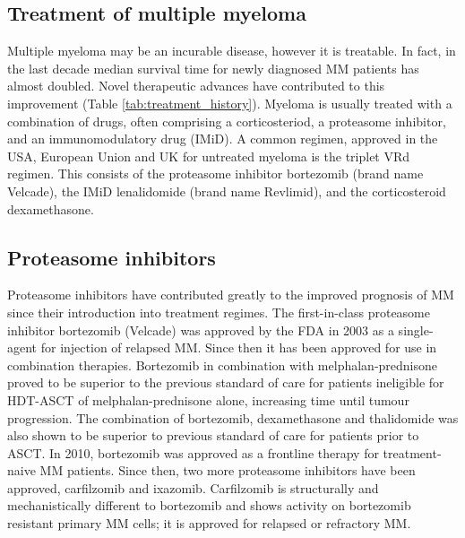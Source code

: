 \subsection{Treatment of multiple myeloma}\label{subsec:mm_treatment}
Multiple myeloma may be an incurable disease, however it is treatable.
In fact, in the last decade median survival time for newly diagnosed MM patients has almost doubled\cite{kazandjian2016look}.
Novel therapeutic advances have contributed to this improvement (Table \ref{tab:treatment_history}).
Myeloma is usually treated with a combination of drugs, often comprising a corticosteriod, a proteasome inhibitor, and an immunomodulatory drug (IMiD).
A common regimen, approved in the USA, European Union and UK for untreated myeloma is the triplet VRd regimen.
This consists of the proteasome inhibitor bortezomib (brand name Velcade), the IMiD lenalidomide (brand name Revlimid), and the corticosteroid dexamethasone.



\subsection{Proteasome inhibitors}
Proteasome inhibitors have contributed greatly to the improved prognosis of MM since their introduction into treatment regimes.
The first-in-class proteasome inhibitor bortezomib (Velcade\textsuperscript{\textregistered}) was approved by the FDA in 2003 as a single-agent for injection of relapsed MM\cite{kane2003velcade}.
Since then it has been approved for use in combination therapies.
Bortezomib in combination with melphalan-prednisone proved to be superior to the previous standard of care for patients ineligible for HDT-ASCT of melphalan-prednisone alone, increasing time until tumour progression\cite{san2008bortezomib}.
The combination of bortezomib, dexamethasone and thalidomide  was also shown to be superior to previous standard of care for patients prior to ASCT\cite{moreau2012proteasome}.
In 2010, bortezomib was approved as a frontline therapy for treatment-naive MM patients.
Since then, two more proteasome inhibitors have been approved, carfilzomib and ixazomib.
Carfilzomib is structurally and mechanistically different to bortezomib and shows activity on bortezomib resistant primary MM cells\cite{moreau2012proteasome}; it is approved for relapsed or refractory MM\@.

